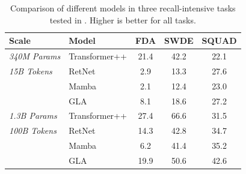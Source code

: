 \begin{table}

\centering
\small 
        \begin{tabular}{l lccc}
        \toprule[0.5mm]
  \textbf{Scale} &   \textbf{Model}  &  \textbf{FDA} & \textbf{SWDE} & \textbf{SQUAD} \\
      \bottomrule
 \textit{340M Params}  &   Transformer++ &  21.4 & 42.2 & 22.1 \\
 \textit{15B Tokens}  &   RetNet & 2.9 & 13.3 & 27.6 \\
   &   Mamba & 2.1 & 12.4 & 23.0 \\
   &   GLA  & 8.1 & 18.6 & 27.2 \\      
      \midrule
 \textit{1.3B Params}   &   Transformer++ & 27.4 & 66.6 & 31.5 \\
 \textit{100B Tokens}   &   RetNet & 14.3 & 42.8 & 34.7 \\
   &   Mamba &  6.2 & 41.4 & 35.2 \\
   &   GLA  & 19.9 &  50.6 & 42.6 \\      
    \bottomrule
    \end{tabular}
    \vspace{-2mm}
    \caption{Comparison of different models in three recall-intensive tasks tested in \citet{Arora2024SimpleLA}. Higher is better for all tasks. 
    }
    \label{tab:recall-intensive}
%
\end{table}

